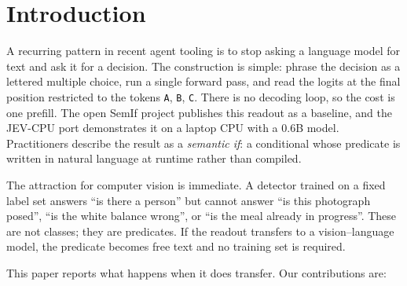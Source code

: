 \documentclass[10pt,twocolumn]{article}
\begin{document}
\begin{abstract}
Repeating the protocol on the 2B separates what the readout does from what the
model does: the gap predicts correctness at AUC 0.896 against 0.894 and
order-stability at 0.972 against 0.980, while accuracy, gap magnitude, flip
rate and collapse fraction all move with the model.

Two negative results survive the scale-up. First, difficulty is not
epistemics: on 12 normative questions no model can ground, the gap
distribution shifts (median 8.8 vs 20.9 nats, AUC 0.788, $p=0.006$) but
overlaps so heavily that the best threshold still admits 7 of 12---the model
asserts that a photograph requires legal consent at 15.6 nats, as confidently
as it reports that no dog is present at 26.4. Second, our own 22-item probe
scored 22/22 with every softmax probability above $0.9993$, which we initially
read as universal saturation; the 4329-item run shows that this was a property
of an over-easy benchmark, and we report it as a caution about small
author-written test sets.
\end{abstract}

\section{Introduction}

A recurring pattern in recent agent tooling is to stop asking a language model
for text and ask it for a decision. The construction is simple: phrase the
decision as a lettered multiple choice, run a single forward pass, and read the
logits at the final position restricted to the tokens \texttt{A}, \texttt{B},
\texttt{C}. There is no decoding loop, so the cost is one prefill. The open
SemIf project \cite{semif} publishes this readout as a baseline, and the
JEV-CPU port \cite{jevcpu} demonstrates it on a laptop CPU with a 0.6B model.
Practitioners describe the result as a \emph{semantic if}: a conditional whose
predicate is written in natural language at runtime rather than compiled.

The attraction for computer vision is immediate. A detector trained on a fixed
label set answers ``is there a person'' but cannot answer ``is this photograph
posed'', ``is the white balance wrong'', or ``is the meal already in progress''.
These are not classes; they are predicates. If the readout transfers to a
vision--language model, the predicate becomes free text and no training set is
required.

This paper reports what happens when it does transfer. Our contributions are:
\end{document}
